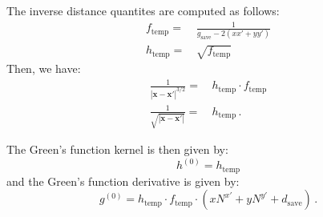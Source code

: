 The inverse distance quantites are computed as follows:
\begin{align}
 f_\textrm{temp} =&\, \frac{1}{g_\textrm{save} - 2 (x x' + y y')} \\
 h_\textrm{temp} =&\, \sqrt{f_\textrm{temp}}
\end{align}
Then, we have:
\begin{align}
 \frac{1}{      |\mathbf{x} - \mathbf{x}'|^{3/2}} =&\, h_\textrm{temp} \cdot f_\textrm{temp} \\
 \frac{1}{\sqrt{|\mathbf{x} - \mathbf{x}'|}     } =&\, h_\textrm{temp} \, .
\end{align}

The Green's function kernel is then given by:
\begin{equation}
 h^{(0)} = h_\textrm{temp}
\end{equation}
and the Green's function derivative is given by:
\begin{equation}
 g^{(0)} = h_\textrm{temp} \cdot f_\textrm{temp} \cdot \left( x N^{x'} + y N^{y'} + d_\textrm{save} \right) \, .
\end{equation}

